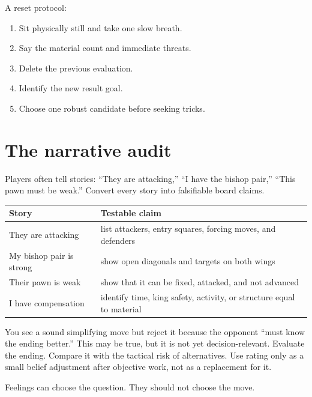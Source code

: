 A reset protocol:

\begin{enumerate}[label=\textbf{\arabic*.},leftmargin=2em]
\item Sit physically still and take one slow breath.
\item Say the material count and immediate threats.
\item Delete the previous evaluation.
\item Identify the new result goal.
\item Choose one robust candidate before seeking tricks.
\end{enumerate}

\section{The narrative audit}
Players often tell stories: ``They are attacking,'' ``I have the bishop pair,'' ``This pawn must be weak.'' Convert every story into falsifiable board claims.

\begin{center}
\begin{tabularx}{.92\textwidth}{YY}
\toprule
\textbf{Story} & \textbf{Testable claim}\\
\midrule
They are attacking & list attackers, entry squares, forcing moves, and defenders\\
My bishop pair is strong & show open diagonals and targets on both wings\\
Their pawn is weak & show that it can be fixed, attacked, and not advanced\\
I have compensation & identify time, king safety, activity, or structure equal to material\\
\bottomrule
\end{tabularx}
\end{center}

\begin{workedbox}[title={Worked example: fear of the higher-rated opponent}]
You see a sound simplifying move but reject it because the opponent ``must know the ending better.'' This may be true, but it is not yet decision-relevant. Evaluate the ending. Compare it with the tactical risk of alternatives. Use rating only as a small belief adjustment after objective work, not as a replacement for it.
\end{workedbox}

\begin{memorybox}
Feelings can choose the question. They should not choose the move.
\end{memorybox}

